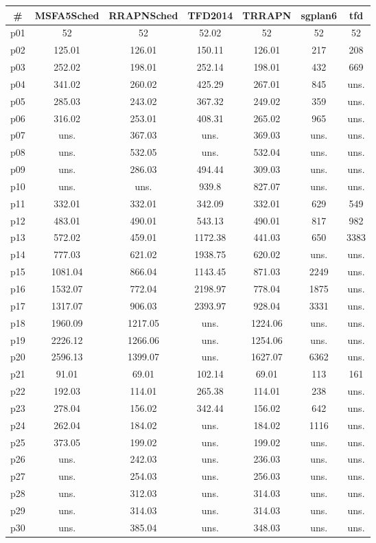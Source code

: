 \begin{tabular}{c||c|c|c|c|c|c}
\textbf{\#} & \textbf{MSFA5Sched} & \textbf{RRAPNSched} & \textbf{TFD2014} & \textbf{TRRAPN} & \textbf{sgplan6} & \textbf{tfd}\\
\hline
\hline
p01 & 52 & 52 & 52.02 & 52 & 52 & 52\\
p02 & 125.01 & 126.01 & 150.11 & 126.01 & 217 & 208\\
p03 & 252.02 & 198.01 & 252.14 & 198.01 & 432 & 669\\
p04 & 341.02 & 260.02 & 425.29 & 267.01 & 845 & uns.\\
p05 & 285.03 & 243.02 & 367.32 & 249.02 & 359 & uns.\\
p06 & 316.02 & 253.01 & 408.31 & 265.02 & 965 & uns.\\
p07 & uns. & 367.03 & uns. & 369.03 & uns. & uns.\\
p08 & uns. & 532.05 & uns. & 532.04 & uns. & uns.\\
p09 & uns. & 286.03 & 494.44 & 309.03 & uns. & uns.\\
p10 & uns. & uns. & 939.8 & 827.07 & uns. & uns.\\
p11 & 332.01 & 332.01 & 342.09 & 332.01 & 629 & 549\\
p12 & 483.01 & 490.01 & 543.13 & 490.01 & 817 & 982\\
p13 & 572.02 & 459.01 & 1172.38 & 441.03 & 650 & 3383\\
p14 & 777.03 & 621.02 & 1938.75 & 620.02 & uns. & uns.\\
p15 & 1081.04 & 866.04 & 1143.45 & 871.03 & 2249 & uns.\\
p16 & 1532.07 & 772.04 & 2198.97 & 778.04 & 1875 & uns.\\
p17 & 1317.07 & 906.03 & 2393.97 & 928.04 & 3331 & uns.\\
p18 & 1960.09 & 1217.05 & uns. & 1224.06 & uns. & uns.\\
p19 & 2226.12 & 1266.06 & uns. & 1254.06 & uns. & uns.\\
p20 & 2596.13 & 1399.07 & uns. & 1627.07 & 6362 & uns.\\
p21 & 91.01 & 69.01 & 102.14 & 69.01 & 113 & 161\\
p22 & 192.03 & 114.01 & 265.38 & 114.01 & 238 & uns.\\
p23 & 278.04 & 156.02 & 342.44 & 156.02 & 642 & uns.\\
p24 & 262.04 & 184.02 & uns. & 184.02 & 1116 & uns.\\
p25 & 373.05 & 199.02 & uns. & 199.02 & uns. & uns.\\
p26 & uns. & 242.03 & uns. & 236.03 & uns. & uns.\\
p27 & uns. & 254.03 & uns. & 256.03 & uns. & uns.\\
p28 & uns. & 312.03 & uns. & 314.03 & uns. & uns.\\
p29 & uns. & 314.03 & uns. & 314.03 & uns. & uns.\\
p30 & uns. & 385.04 & uns. & 348.03 & uns. & uns.\\
\end{tabular}

